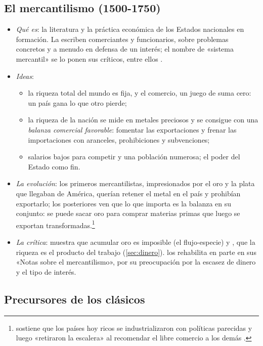 \documentclass[11pt]{article}
\begin{document}
\subsection{El mercantilismo (1500-1750)}\label{anexo:mercantilismo}

\begin{itemize}
\item \emph{Qué es}: la literatura y la práctica económica de los Estados nacionales en formación. La escriben comerciantes y funcionarios, sobre problemas concretos y a menudo en defensa de un interés; el nombre de «sistema mercantil» se lo ponen sus críticos, entre ellos \nocite{LandrethColander2006Historia}.
\item \emph{Ideas}:
  \begin{itemize}
  \item la riqueza total del mundo es fija, y el comercio, un juego de suma cero: un país gana lo que otro pierde;
  \item la riqueza de la nación se mide en metales preciosos y se consigue con una \emph{balanza comercial favorable}: fomentar las exportaciones y frenar las importaciones con aranceles, prohibiciones y subvenciones\nocite{Mun1664England};
  \item salarios bajos para competir y una población numerosa; el poder del Estado como fin.
  \end{itemize}
\item \emph{La evolución}: los primeros mercantilistas, impresionados por el oro y la plata que llegaban de América, querían retener el metal en el país y prohibían exportarlo; los posteriores ven que lo que importa es la balanza en su conjunto: se puede sacar oro para comprar materias primas que luego se exportan transformadas\nocite{LandrethColander2006Historia}.\footnote{\textcite{Chang2002} sostiene que los países hoy ricos se industrializaron con políticas parecidas y luego «retiraron la escalera» al recomendar el libre comercio a los demás .}
\item \emph{La crítica}:  muestra que acumular oro es imposible (el flujo-especie) y , que la riqueza es el producto del trabajo (\ref{sec:dinero}).  los rehabilita en parte en sus «Notas sobre el mercantilismo», por su preocupación por la escasez de dinero y el tipo de interés\nocite{Keynes1936}.
\end{itemize}

\subsection{Precursores de los clásicos}\label{anexo:precursores}
\end{document}
